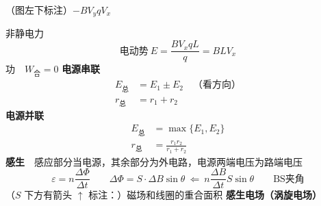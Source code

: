 （图左下标注）$-BV_yqV_x$

非静电力
\[
\text{电动势}\ E=\frac{BV_xqL}{q}=BLV_x
\]
功　$W_{\text{合}}=0$
\textbf{电源串联}
\begin{align*}
E_{\text{总}}&=E_1\pm E_2\quad\text{（看方向）}\\
r_{\text{总}}&=r_1+r_2
\end{align*}
\textbf{电源并联}
\begin{align*}
E_{\text{总}}&=\max\{E_1,E_2\}\\
r_{\text{总}}&=\frac{r_1r_2}{r_1+r_2}
\end{align*}
\textbf{感生}　感应部分当电源，其余部分为外电路，电源两端电压为路端电压
\[
\varepsilon=n\frac{\Delta\Phi}{\Delta t}\qquad
\Delta\Phi=S\cdot\Delta B\sin\theta\ \Leftarrow\ n\frac{\Delta B}{\Delta t}S\sin\theta\qquad
\text{BS夹角}
\]
（$S$ 下方有箭头 $\uparrow$ 标注：）磁场和线圈的重合面积
\textbf{感生电场（涡旋电场）}

